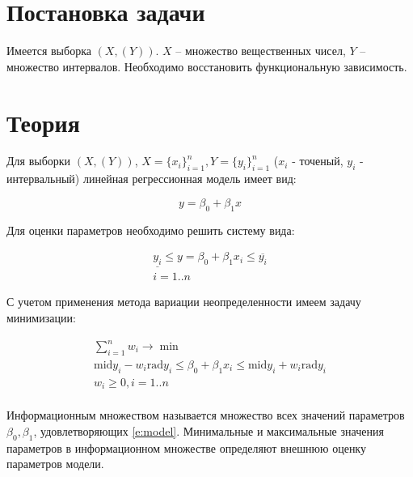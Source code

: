 \documentclass[a4paper,12pt]{article}
\begin{document}

\newpage

\tableofcontents
\listoffigures
\newpage

\section{Постановка задачи}
\quad Имеется выборка $ (X, (Y)) $. $ X $ -- множество вещественных чисел,
$ Y $ -- множество интервалов. Необходимо восстановить функциональную зависимость.

\section{Теория}
\quad Для выборки $ (X, (Y))$, $ X = \{x_i\}_{i=1}^{n}, {Y} = \{{y}_i\}_{i=1}^{n} $
($ x_i $ - точеный, $ {y}_i $ - интервальный) линейная регрессионная модель имеет вид:

\begin{equation}
  y = \beta_0 + \beta_1 x
  \label{e:model}
\end{equation}

Для оценки параметров необходимо решить систему вида:

\begin{equation}
  \begin{gathered}
    \underline{y_i} \leq  y = \beta_0 + \beta_1 x_i \leq \overline{y_i} \\
    i = 1..n
  \end{gathered}
\end{equation}

С учетом применения метода вариации неопределенности имеем задачу минимизации:

\begin{equation}
  \begin{gathered}
    \sum_{i = 1}^{n}w_{i} \to \min \\
    \text{mid}{y}_{i} - w_{i} \text{rad}{y}_{i} \leq \beta_0 + \beta_1 x_i \leq \text{mid}{y}_{i} + w_{i} \text{rad}{y}_{i} \\
    w_{i} \geq 0, i = 1..n \\
  \end{gathered}
\end{equation}

\quad Информационным множеством называется множество всех значений параметров
$ \beta_0, \beta_1 $, удовлетворяющих \ref{e:model}. Минимальные и максимальные значения
параметров в информационном множестве определяют внешнюю оценку параметров модели.
\end{document}

